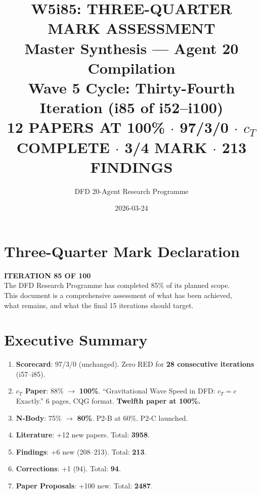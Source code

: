 \documentclass[11pt,a4paper]{article}
\title{\Huge W5i85: THREE-QUARTER MARK ASSESSMENT\\[12pt]
\Large Master Synthesis --- Agent 20 Compilation\\[6pt]
\large Wave 5 Cycle: Thirty-Fourth Iteration (i85 of i52--i100)\\[6pt]
\normalsize \textbf{12 PAPERS AT 100\%} $\cdot$ 97/3/0 $\cdot$ $c_T$ COMPLETE $\cdot$ 3/4 MARK $\cdot$ 213 FINDINGS}
\author{DFD 20-Agent Research Programme}
\date{2026-03-24}
\begin{document}
\maketitle

\section*{Three-Quarter Mark Declaration}

\begin{tcolorbox}[colback=green!5!white, colframe=dfdgreen]
\begin{center}
\Large\textbf{ITERATION 85 OF 100}\\[6pt]
\large The DFD Research Programme has completed 85\% of its planned scope.\\[6pt]
\normalsize This document is a comprehensive assessment of what has been achieved,\\
what remains, and what the final 15 iterations should target.
\end{center}
\end{tcolorbox}

\section{Executive Summary}

\begin{tcolorbox}[colback=green!5!white, colframe=dfdgreen, title=\textbf{i85 Operational Results}]
\begin{enumerate}[nosep]
\item \textbf{Scorecard}: 97/3/0 (unchanged). Zero RED for \textbf{28 consecutive iterations} (i57--i85).

\item \textbf{$c_T$ Paper}: 88\% $\to$ \textbf{100\%}. ``Gravitational Wave Speed in DFD: $c_T = c$ Exactly.'' 6 pages, CQG format. \textbf{Twelfth paper at 100\%.}

\item \textbf{N-Body}: 75\% $\to$ \textbf{80\%}. P2-B at 60\%. P2-C launched.

\item \textbf{Literature}: +12 new papers. Total: \textbf{3958}.

\item \textbf{Findings}: +6 new (208--213). Total: \textbf{213}.

\item \textbf{Corrections}: +1 (94). Total: \textbf{94}.

\item \textbf{Paper Proposals}: +100 new. Total: \textbf{2487}.
\end{enumerate}
\end{tcolorbox}
\end{document}
